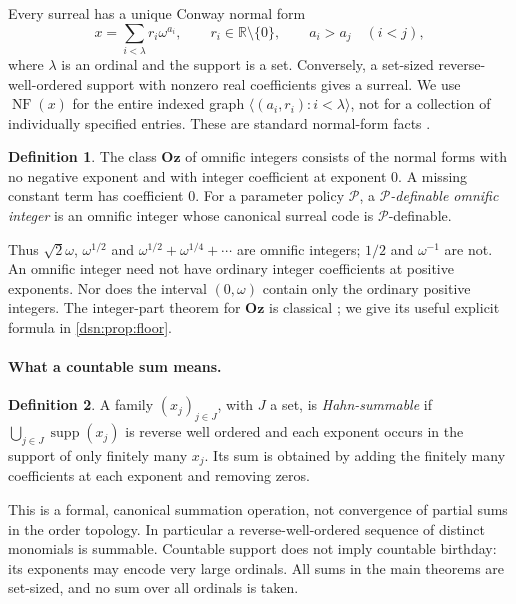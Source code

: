 \documentclass[11pt,a4paper]{article}
\numberwithin{equation}{section}
\theoremstyle{definition}
\newtheorem{definition}[definition]{Definition}
\theoremstyle{remark}
\newcommand{\Oz}{\mathbf{Oz}}
\newcommand{\R}{\mathbb R}
\newcommand{\supp}{\operatorname{supp}}
\newcommand{\NF}{\operatorname{NF}}
\newcommand{\seq}[1]{\langle #1\rangle}
\begin{document}
Every surreal has a unique Conway normal form
\begin{equation}\label{dsn:ca:eq:nf}
 x=\sum_{i<\lambda} r_i\omega^{a_i},
 \qquad r_i\in\R\setminus\{0\},\qquad a_i>a_j\quad(i<j),
\end{equation}
where $\lambda$ is an ordinal and the support is a set. Conversely, a
set-sized reverse-well-ordered support with nonzero real coefficients
gives a surreal. We use $\NF(x)$ for the entire indexed graph
$\seq{(a_i,r_i):i<\lambda}$, not for a collection of individually
specified entries. These are standard normal-form facts
\cite{Conway,Gonshor,LM}.

\begin{definition}
The class $\Oz$ of omnific integers consists of the normal forms with no
negative exponent and with integer coefficient at exponent $0$. A
missing constant term has coefficient $0$. For a parameter policy
$\mathcal P$, a \emph{$\mathcal P$-definable omnific integer} is an
omnific integer whose canonical surreal code is $\mathcal P$-definable.
\end{definition}

Thus $\sqrt2\omega$, $\omega^{1/2}$ and
$\omega^{1/2}+\omega^{1/4}+\cdots$ are omnific integers; $1/2$ and
$\omega^{-1}$ are not. An omnific integer need not have ordinary integer
coefficients at positive exponents. Nor does the interval $(0,\omega)$
contain only the ordinary positive integers. The integer-part theorem
for $\Oz$ is classical \cite{LM}; we give its useful explicit formula in
\cref{dsn:prop:floor}.

\paragraph{What a countable sum means.}

\begin{definition}\label{dsn:ca:def:summable}
A family $(x_j)_{j\in J}$, with $J$ a set, is \emph{Hahn-summable} if
$\bigcup_{j\in J}\supp(x_j)$ is reverse well ordered and each exponent
occurs in the support of only finitely many $x_j$. Its sum is obtained by
adding the finitely many coefficients at each exponent and removing
zeros.
\end{definition}

This is a formal, canonical summation operation, not convergence of
partial sums in the order topology. In particular a reverse-well-ordered
sequence of distinct monomials is summable. Countable support does not
imply countable birthday: its exponents may encode very large ordinals.
All sums in the main theorems are set-sized, and no sum over all ordinals
is taken.
\end{document}
